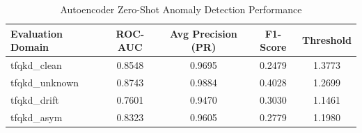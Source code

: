 \begin{table}[htbp]
\centering
\caption{Autoencoder Zero-Shot Anomaly Detection Performance}
\label{tab:anomaly_metrics}
\begin{tabular}{@{}lcccc@{}}
\toprule
\textbf{Evaluation Domain} & \textbf{ROC-AUC} & \textbf{Avg Precision (PR)} & \textbf{F1-Score} & \textbf{Threshold} \\ \midrule
tfqkd\_clean & 0.8548 & 0.9695 & 0.2479 & 1.3773 \\
tfqkd\_unknown & 0.8743 & 0.9884 & 0.4028 & 1.2699 \\
tfqkd\_drift & 0.7601 & 0.9470 & 0.3030 & 1.1461 \\
tfqkd\_asym & 0.8323 & 0.9605 & 0.2779 & 1.1980 \\
\bottomrule
\end{tabular}
\end{table}
